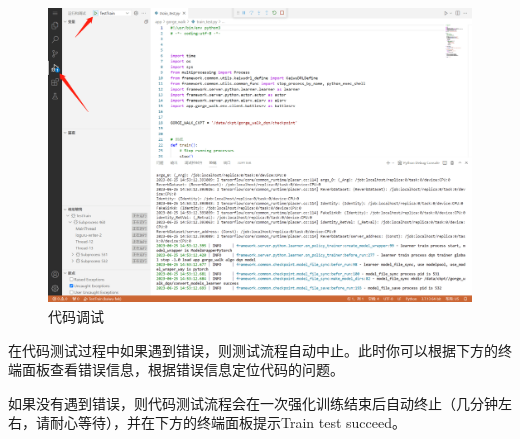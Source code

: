 \begin{figure}[H]
    \centering
    \includegraphics[width=1\linewidth]{pic/debug.png}
    \caption{ 代码调试}
    \label{debug}
\end{figure}

在代码测试过程中如果遇到错误，则测试流程自动中止。此时你可以根据下方的终端面板查看错误信息，根据错误信息定位代码的问题。

如果没有遇到错误，则代码测试流程会在一次强化训练结束后自动终止（几分钟左右，请耐心等待），并在下方的终端面板提示Train test succeed。